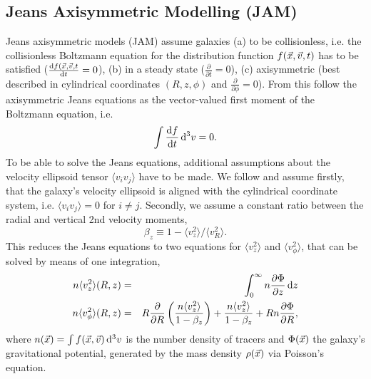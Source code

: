 \subsection{Jeans Axisymmetric Modelling (JAM)} \label{sec:model_JAM}

Jeans axisymmetric models (JAM) assume galaxies (a) to be collisionless, i.e. the collisionless Boltzmann equation for the distribution function $f(\vec{x},\vec{v},t)$ has to be satisfied ($\frac{\mathop{}\!\mathrm{d} f(\vec{x},\vec{v},t}{\mathop{}\!\mathrm{d} t} = 0$), (b) in a steady state ($\frac{\partial}{\partial t} = 0$), (c) axisymmetric (best described in cylindrical coordinates $(R,z,\phi)$ and $\frac{\partial}{\partial \phi} = 0$). From this follow the axisymmetric Jeans equations as the vector-valued first moment of the Boltzmann equation, i.e.
\begin{equation*}
\int \frac{\mathop{}\!\mathrm{d} f}{\mathop{}\!\mathrm{d} t} \mathop{}\!\mathrm{d^3} v = 0.
\end{equation*}
To be able to solve the Jeans equations, additional assumptions about the velocity ellipsoid tensor $\langle v_i v_j\rangle$ have to be made. We follow \citet{Cap08} and assume firstly, that the galaxy's velocity ellipsoid is aligned with the cylindrical coordinate system, i.e. $\langle v_i v_j\rangle = 0$ for $i\neq j$. Secondly, we assume a constant ratio between the radial and vertical 2nd velocity moments, 
\begin{equation}
\beta_z \equiv 1 - \langle v_z^2 \rangle / \langle v_R^2\rangle. \label{eq:bz}
\end{equation}
This reduces the Jeans equations to two equations for $\langle v_z^2 \rangle$ and $\langle v_\phi^2 \rangle$, that can be solved by means of one integration,
\begin{eqnarray}
n \langle v_z^2 \rangle (R,z) &=& \int_0^\infty n \frac{\partial \Phi}{\partial z} \mathop{}\!\mathrm{d} z \label{eq:Jeans1}\\
n \langle v_\phi^2 \rangle (R,z) &=& R \frac{\partial}{\partial R} \left( \frac{n \langle v_z^2 \rangle}{1-\beta_z} \right) + \frac{n \langle v_z^2 \rangle}{1 - \beta_z} + R n \frac{\partial \Phi}{\partial R},\label{eq:Jeans2}
\end{eqnarray}
where $n(\vec{x}) = \int f(\vec{x},\vec{v}) \mathop{}\!\mathrm{d^3} v$ is the number density of tracers and $\Phi(\vec{x})$ the galaxy's gravitational potential, generated by the mass density $\rho(\vec{x})$ via Poisson's equation.
